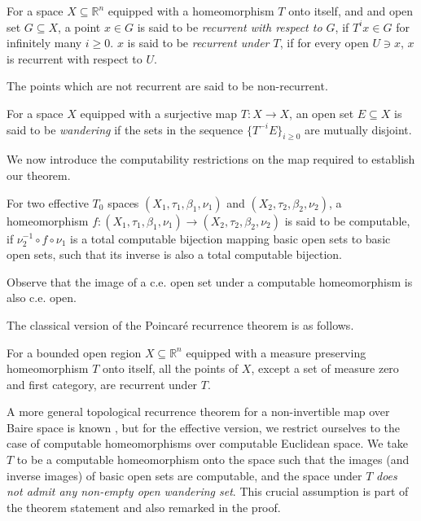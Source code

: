 \documentclass[a4paper,UKenglish,autoref,thm-restate,numberwithinsect]{lipics-v2021}
\begin{document}
\begin{definition}[Recurrence]
	For a space $X\subseteq\mathbb{R}^n$ equipped with a homeomorphism $T$ onto itself, and and open set $G\subseteq X$, a point $x\in G$ is said to be \textit{recurrent with respect to $G$}, if $T^ix\in G$ for infinitely many $i\geq0$. $x$ is said to be \textit{recurrent under $T$}, if for every open $U\ni x$, $x$ is recurrent with respect to $U$. 
\end{definition}

The points which are not recurrent are said to be non-recurrent. 

\begin{definition}
	For a space $X$ equipped with a surjective map $T:X\to X$, an open set $E\subseteq X$ is said to be \emph{wandering} if the sets in the sequence $\{T^{-i}E\}_{i\geq0}$ are mutually disjoint.
\end{definition}

We now introduce the computability restrictions on the map required to establish our theorem. 

\begin{definition}
	For two effective $T_0$ spaces $(X_1,\tau_1,\beta_1,\nu_1)$ and $(X_2,\tau_2,\beta_2,\nu_2)$, a homeomorphism $f:(X_1,\tau_1,\beta_1,\nu_1)\to(X_2,\tau_2,\beta_2,\nu_2)$ is said	to be computable, if $\nu_2^{-1}\circ f\circ\nu_1$ is a total computable bijection mapping basic open sets to basic open sets, such that its inverse is also a total computable bijection. 
\end{definition} 

Observe that the image of a c.e. open set under a computable homeomorphism is also c.e. open. 

The classical version of the Poincar\'e recurrence theorem is as follows. 

\begin{theorem}\label{thm:classprt}
	For a bounded open region $X\subseteq\mathbb{R}^n$ equipped with a 	measure preserving homeomorphism $T$ onto itself, all the points of	$X$, except a set of measure zero and first category, are recurrent under $T$.
\end{theorem}

A more general topological recurrence theorem for a non-invertible map over Baire space is known \cite{Malicky2007}, but for the effective version, we restrict ourselves to the case of computable homeomorphisms over computable Euclidean space. We take $T$ to be a computable homeomorphism onto the space such that the images (and inverse images) of basic open sets are computable, and the space under $T$ \textit{does not admit any non-empty open wandering set}. This crucial assumption is part of the theorem statement and also remarked in the proof. 
\end{document}
